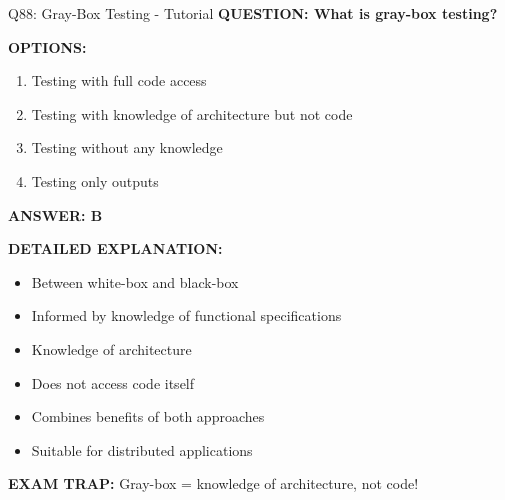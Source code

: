 \documentclass[8pt]{beamer}
\begin{document}
	\begin{frame}{Q88: Gray-Box Testing - Tutorial}
		\fontsize{6.5}{7.5}\selectfont
		\textbf{QUESTION: What is gray-box testing?}
		
		\vspace{0.1cm}
		\textbf{OPTIONS:}
		\begin{enumerate}
			\item Testing with full code access
			\item Testing with knowledge of architecture but not code
			\item Testing without any knowledge
			\item Testing only outputs
		\end{enumerate}
		
		\vspace{0.1cm}
		\textcolor{myblue}{\textbf{ANSWER: B}}
		
		\vspace{0.1cm}
		\textbf{DETAILED EXPLANATION:}
		\begin{itemize}
			\item Between white-box and black-box
			\item Informed by knowledge of functional specifications
			\item Knowledge of architecture
			\item Does not access code itself
			\item Combines benefits of both approaches
			\item Suitable for distributed applications
		\end{itemize}
		
		\vspace{0.1cm}
		\textcolor{myred}{\textbf{EXAM TRAP:}} Gray-box = \textcolor{myblue}{knowledge of architecture, not code}!
	\end{frame}
	
\end{document}
